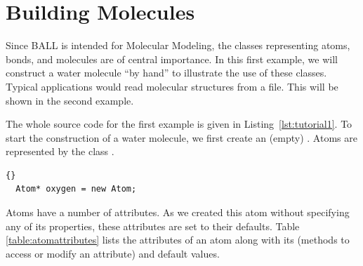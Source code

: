 \section{Building Molecules}

Since BALL is intended for Molecular Modeling, the classes representing atoms,
bonds, and molecules are of central importance. In this first example, we will
construct a water molecule ``by hand'' to illustrate the use of these classes.
Typical applications would read molecular structures from a file. This will be
shown in the second example.

\noindent
The whole source code for the first example is given in
Listing~\ref{lst:tutorial1}. To start the construction of a water molecule, we
first create an (empty) . Atoms are represented by the class
.

\begin{lstlisting}{}
  Atom* oxygen = new Atom;
\end{lstlisting}
	
\noindent
Atoms have a number of attributes. As we created this atom without specifying
any of its properties, these attributes are set to their defaults. 
Table \ref{table:atomattributes} lists the attributes of an atom along with its
 (methods to access or modify an attribute) and default
values.

